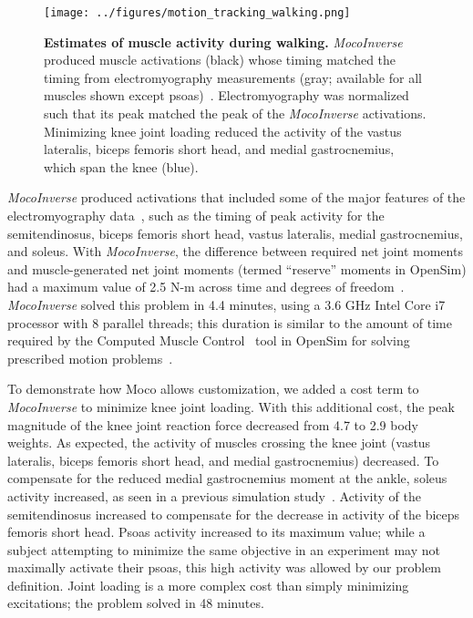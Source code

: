 \documentclass[10pt,letterpaper]{article}
\begin{document}
\begin{figure}[!h]
        \begin{adjustwidth}{-1.125in}{-1.125in} %
    \centering
    \texttt{[image: ../figures/motion\_tracking\_walking.png]}
    \caption{{\bf Estimates of muscle activity during walking.}
    \textit{MocoInverse} produced muscle activations (black) whose timing matched the timing from electromyography measurements (gray; available for all muscles shown except psoas)~\cite{Arnold:2013cs}. Electromyography was normalized such that its peak matched the peak of the \textit{MocoInverse} activations. Minimizing knee joint loading reduced the activity of the vastus lateralis, biceps femoris short head, and medial gastrocnemius, which span the knee (blue).
    }
    \label{walking}
        \end{adjustwidth}
\end{figure}
\textit{MocoInverse} produced activations that included some of the major features of the electromyography data~\cite{Arnold:2013cs}, such as the timing of peak activity for the semitendinosus, biceps femoris short head, vastus lateralis, medial gastrocnemius, and soleus. With \textit{MocoInverse}, the difference between required net joint moments and muscle-generated net joint moments (termed “reserve” moments in OpenSim) had a maximum value of 2.5 N-m across time and degrees of freedom~\cite{Hicks:2015bo}. \textit{MocoInverse} solved this problem in 4.4 minutes, using a 3.6 GHz Intel Core i7 processor with 8 parallel threads; this duration is similar to the amount of time required by the Computed Muscle Control~\cite{Thelen:2003bba} tool in OpenSim for solving prescribed motion problems~\cite{Rajagopal:2016ek}.

To demonstrate how Moco allows customization, we added a cost term to \textit{MocoInverse} to minimize knee joint loading. With this additional cost, the peak magnitude of the knee joint reaction force decreased from 4.7 to 2.9 body weights. As expected, the activity of muscles crossing the knee joint (vastus lateralis, biceps femoris short head, and medial gastrocnemius) decreased. To compensate for the reduced medial gastrocnemius moment at the ankle, soleus activity increased, as seen in a previous simulation study~\cite{DeMers:2014}. Activity of the semitendinosus increased to compensate for the decrease in activity of the biceps femoris short head. Psoas activity increased to its maximum value; while a subject attempting to minimize the same objective in an experiment may not maximally activate their psoas, this high activity was allowed by our problem definition. Joint loading is a more complex cost than simply minimizing excitations; the problem solved in 48 minutes.
\end{document}
